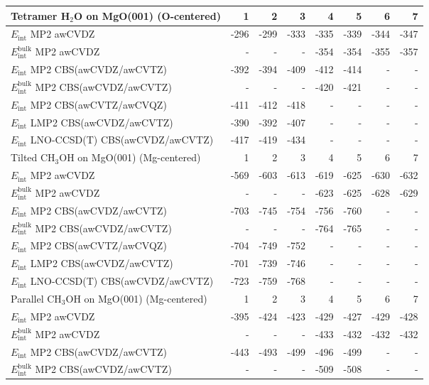 \begin{longtable}{lrrrrrrr}
Tetramer H$_2$O on MgO(001) (O-centered) & 1 & 2 & 3 & 4 & 5 & 6 & 7 \\ 
\midrule
$E_\textrm{int}$ MP2 awCVDZ & -296 & -299 & -333 & -335 & -339 & -344 & -347 \\
$E_\textrm{int}^\textrm{bulk}$ MP2 awCVDZ & - & - & - & -354 & -354 & -355 & -357 \\
$E_\textrm{int}$ MP2 CBS(awCVDZ/awCVTZ) & -392 & -394 & -409 & -412 & -414 & - & - \\
$E_\textrm{int}^\textrm{bulk}$ MP2 CBS(awCVDZ/awCVTZ) & - & - & - & -420 & -421 & - & - \\
$E_\textrm{int}$ MP2 CBS(awCVTZ/awCVQZ) & -411 & -412 & -418 & - & - & - & - \\
$E_\textrm{int}$ LMP2 CBS(awCVDZ/awCVTZ) & -390 & -392 & -407 & - & - & - & - \\
$E_\textrm{int}$ LNO-CCSD(T) CBS(awCVDZ/awCVTZ) & -417 & -419 & -434 & - & - & - & - \\
\toprule
Tilted CH$_3$OH on MgO(001) (Mg-centered) & 1 & 2 & 3 & 4 & 5 & 6 & 7 \\ 
\midrule
$E_\textrm{int}$ MP2 awCVDZ & -569 & -603 & -613 & -619 & -625 & -630 & -632 \\
$E_\textrm{int}^\textrm{bulk}$ MP2 awCVDZ & - & - & - & -623 & -625 & -628 & -629 \\
$E_\textrm{int}$ MP2 CBS(awCVDZ/awCVTZ) & -703 & -745 & -754 & -756 & -760 & - & - \\
$E_\textrm{int}^\textrm{bulk}$ MP2 CBS(awCVDZ/awCVTZ) & - & - & - & -764 & -765 & - & - \\
$E_\textrm{int}$ MP2 CBS(awCVTZ/awCVQZ) & -704 & -749 & -752 & - & - & - & - \\
$E_\textrm{int}$ LMP2 CBS(awCVDZ/awCVTZ) & -701 & -739 & -746 & - & - & - & - \\
$E_\textrm{int}$ LNO-CCSD(T) CBS(awCVDZ/awCVTZ) & -723 & -759 & -768 & - & - & - & - \\
\toprule
Parallel CH$_3$OH on MgO(001) (Mg-centered) & 1 & 2 & 3 & 4 & 5 & 6 & 7 \\ 
\midrule
$E_\textrm{int}$ MP2 awCVDZ & -395 & -424 & -423 & -429 & -427 & -429 & -428 \\
$E_\textrm{int}^\textrm{bulk}$ MP2 awCVDZ & - & - & - & -433 & -432 & -432 & -432 \\
$E_\textrm{int}$ MP2 CBS(awCVDZ/awCVTZ) & -443 & -493 & -499 & -496 & -499 & - & - \\
$E_\textrm{int}^\textrm{bulk}$ MP2 CBS(awCVDZ/awCVTZ) & - & - & - & -509 & -508 & - & - \\

\end{longtable}
